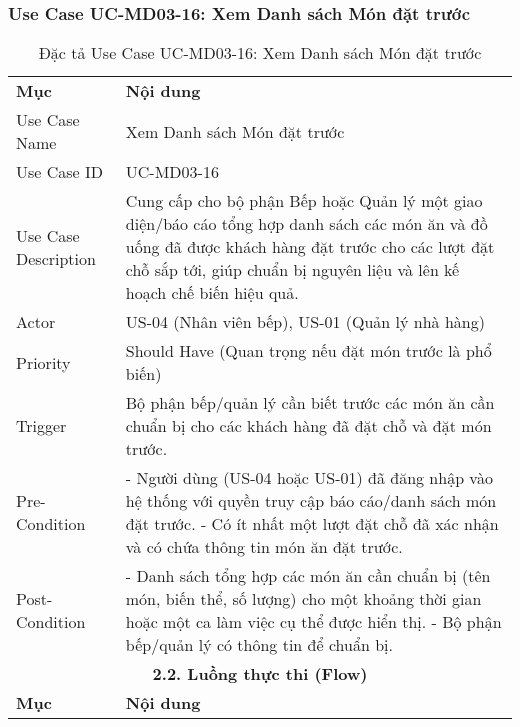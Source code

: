 \subsubsection{Use Case UC-MD03-16: Xem Danh sách Món đặt trước}

\begin{longtable}{|m{4cm}|p{11cm}|}
\caption{Đặc tả Use Case UC-MD03-16: Xem Danh sách Món đặt trước} \label{tab:uc_md03_16} \\
\hline

\endhead %
\hline
\endfoot %
\hline
\endlastfoot %
\multicolumn{2}{|c|}{\textbf{2.1. Tóm tắt (Summary)}} \\
\hline
\textbf{Mục} & \textbf{Nội dung} \\
\hline
Use Case Name & Xem Danh sách Món đặt trước \\
\hline
Use Case ID & UC-MD03-16 \\
\hline
Use Case Description & Cung cấp cho bộ phận Bếp hoặc Quản lý một giao diện/báo cáo tổng hợp danh sách các món ăn và đồ uống đã được khách hàng đặt trước cho các lượt đặt chỗ sắp tới, giúp chuẩn bị nguyên liệu và lên kế hoạch chế biến hiệu quả. \\
\hline
Actor & US-04 (Nhân viên bếp), US-01 (Quản lý nhà hàng) \\
\hline
Priority & Should Have (Quan trọng nếu đặt món trước là phổ biến) \\
\hline
Trigger & Bộ phận bếp/quản lý cần biết trước các món ăn cần chuẩn bị cho các khách hàng đã đặt chỗ và đặt món trước. \\
\hline
Pre-Condition & - Người dùng (US-04 hoặc US-01) đã đăng nhập vào hệ thống với quyền truy cập báo cáo/danh sách món đặt trước. \newline - Có ít nhất một lượt đặt chỗ đã xác nhận và có chứa thông tin món ăn đặt trước. \\
\hline
Post-Condition & - Danh sách tổng hợp các món ăn cần chuẩn bị (tên món, biến thể, số lượng) cho một khoảng thời gian hoặc một ca làm việc cụ thể được hiển thị. \newline - Bộ phận bếp/quản lý có thông tin để chuẩn bị. \\
\hline
\multicolumn{2}{|c|}{\textbf{2.2. Luồng thực thi (Flow)}} \\
\hline
\textbf{Mục} & \textbf{Nội dung} \\
\hline

\end{longtable}
